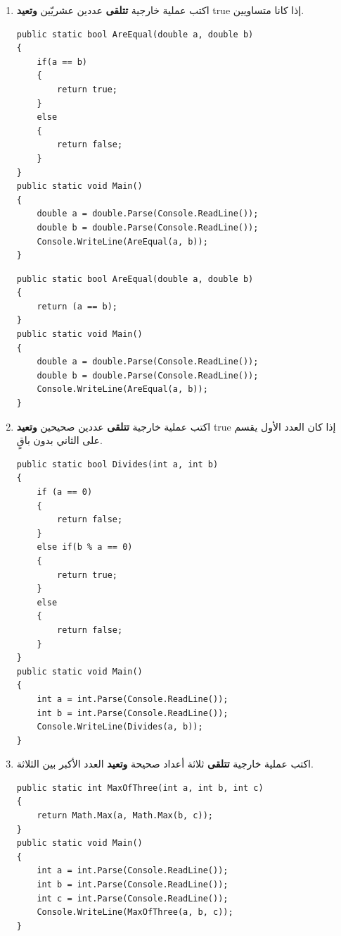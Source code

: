 ﻿\documentclass[12pt]{article}
\begin{document}
\begin{enumerate}[itemsep=3em]
\begin{enumerate}
\item اكتب عملية خارجية \textbf{تتلقى} عددين عشريّين \textbf{وتعيد} \textenglish{true} إذا كانا متساويين.
\ifwithsols
\begin{boxSolution}[1]
\begin{english}
\begin{verbatim}
public static bool AreEqual(double a, double b)
{
    if(a == b)
    {
        return true;
    }
    else
    {
        return false;
    }
}
public static void Main()
{
    double a = double.Parse(Console.ReadLine());
    double b = double.Parse(Console.ReadLine());
    Console.WriteLine(AreEqual(a, b));
}
\end{verbatim}
\end{english}
\end{boxSolution}
\begin{boxSolution}[2]
\begin{english}
\begin{verbatim}
public static bool AreEqual(double a, double b)
{
    return (a == b);
}
public static void Main()
{
    double a = double.Parse(Console.ReadLine());
    double b = double.Parse(Console.ReadLine());
    Console.WriteLine(AreEqual(a, b));
}
\end{verbatim}
\end{english}
\end{boxSolution}
\clearpage
\fi


\item اكتب عملية خارجية \textbf{تتلقى} عددين صحيحين \textbf{وتعيد} \textenglish{true} إذا كان العدد الأول يقسم على الثاني بدون باقٍ.
\ifwithsols
\begin{boxSolution}
\begin{english}
\begin{verbatim}
public static bool Divides(int a, int b)
{
    if (a == 0)
    {
        return false;
    }
    else if(b % a == 0)
    {
        return true;
    }
    else
    {
        return false;
    }
}
public static void Main()
{
    int a = int.Parse(Console.ReadLine());
    int b = int.Parse(Console.ReadLine());
    Console.WriteLine(Divides(a, b));
}
\end{verbatim}
\end{english}
\end{boxSolution}
\clearpage
\fi


\item اكتب عملية خارجية \textbf{تتلقى} ثلاثة أعداد صحيحة \textbf{وتعيد} العدد الأكبر بين الثلاثة.
\ifwithsols
\begin{boxSolution}
\begin{english}
\begin{verbatim}
public static int MaxOfThree(int a, int b, int c)
{
    return Math.Max(a, Math.Max(b, c));
}
public static void Main()
{
    int a = int.Parse(Console.ReadLine());
    int b = int.Parse(Console.ReadLine());
    int c = int.Parse(Console.ReadLine());
    Console.WriteLine(MaxOfThree(a, b, c));
}
\end{verbatim}
\end{english}
\end{boxSolution}
\fi



\end{enumerate}
\end{enumerate}
\end{document}
